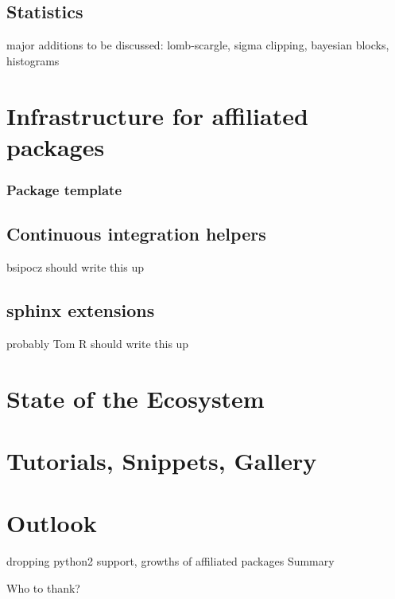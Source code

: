 \documentclass[modern]{aastex61}
\begin{document}
\subsection{Statistics}


major additions to be discussed: lomb-scargle, sigma clipping, bayesian blocks, histograms

\section{Infrastructure for affiliated packages}
\subsubsection{Package template}
\subsection{Continuous integration helpers}
bsipocz should write this up
\subsection{sphinx extensions}
probably Tom R should write this up
\section{State of the Ecosystem}

\section{Tutorials, Snippets, Gallery}

\section{Outlook}
dropping python2 support, growths of affiliated packages
Summary

\acknowledgments

Who to thank?


          
%          
%

\begin{thebibliography}{}

\end{thebibliography}
\end{document}

